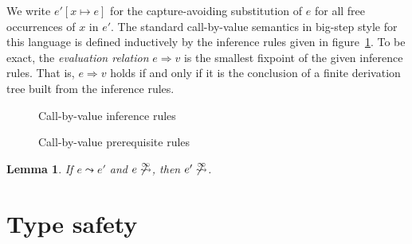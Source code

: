 \documentclass[12pt,a2paper,draft]{article}
\newcommand{\abstr}[2]{\ensuremath{\lambda{#1}.\,{#2}}}
\newcommand{\app}[2]{\ensuremath{{#1}\,{#2}}}
\newcommand{\rec}[2]{\ensuremath{{\normalfont\textsf{rec}}\,{#1}.\,{#2}}}
\newtheorem{lemma}{Lemma}
\begin{document}
We write $e'[x \mapsto e]$ for the capture-avoiding substitution of $e$ for all free occurrences
of $x$ in $e'$. The standard call-by-value semantics in big-step style for this language is
defined inductively by the inference rules given in figure~\ref{fig:Call_by_value_inference_rules}.
To be exact, the \emph{evaluation relation} $e \Rightarrow v$ is the smallest fixpoint of
the given inference rules. That is, $e \Rightarrow v$ holds if and only if it is the conclusion
of a finite derivation tree built from the inference rules.

\begin{figure}[htb]
  \centering
  \caption{Call-by-value inference rules}
  \label{fig:Call_by_value_inference_rules}
\end{figure}

\begin{figure}[htb]
  \centering
  \caption{Call-by-value prerequisite rules}
  \label{fig:Call_by_value_prerequisite_rules}
\end{figure}

\begin{lemma} \label{lemma:Finite_prerequisites}
  If $e \leadsto e'$ and $e \not\stackrel{\infty}{\leadsto}$, then
  $e' \not\stackrel{\infty}{\leadsto}$.
\end{lemma}


\section{Type safety}
\end{document}
